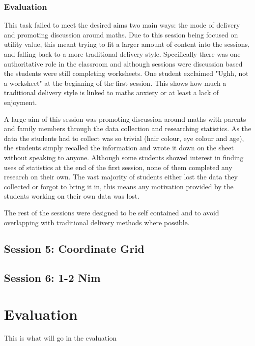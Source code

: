 \documentclass[11pt, a4paper, notitlepage]{article}
\begin{document}
\subsubsection*{Evaluation}
This task failed to meet the desired aims two main ways: the mode of delivery and promoting discussion around maths. Due to this session being focused on utility value, this meant trying to fit a larger amount of content into the sessions, and falling back to a more traditional delivery style. Specifically there was one authoritative role in the classroom and although sessions were discussion based the students were still completing worksheets. One student exclaimed "Ughh, not a worksheet" at the beginning of the first session. This shows how much a traditional delivery style is linked to maths anxiety or at least a lack of enjoyment.
\par
A large aim of this session was promoting discussion around maths with parents and family members through the data collection and researching statistics. As the data the students had to collect was so trivial (hair colour, eye colour and age), the students simply recalled the information and wrote it down on the sheet without speaking to anyone. Although some students showed interest in finding uses of statistics at the end of the first session, none of them completed any research on their own. The vast majority of students either lost the data they collected or forgot to bring it in, this means any motivation provided by the students working on their own data was lost.
\par
The rest of the sessions were designed to be self contained and to avoid overlapping with traditional delivery methods where possible.

\subsection{Session 5: Coordinate Grid}
\subsection{Session 6: 1-2 Nim}


\section{Evaluation}
This is what will go in the evaluation



\end{document}
